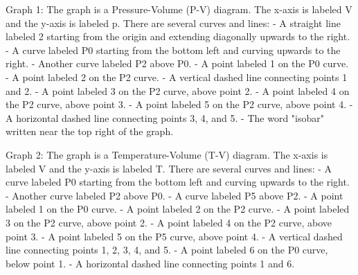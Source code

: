 Graph 1: The graph is a Pressure-Volume (P-V) diagram. The x-axis is labeled V and the y-axis is labeled p. There are several curves and lines:
- A straight line labeled 2 starting from the origin and extending diagonally upwards to the right.
- A curve labeled P0 starting from the bottom left and curving upwards to the right.
- Another curve labeled P2 above P0.
- A point labeled 1 on the P0 curve.
- A point labeled 2 on the P2 curve.
- A vertical dashed line connecting points 1 and 2.
- A point labeled 3 on the P2 curve, above point 2.
- A point labeled 4 on the P2 curve, above point 3.
- A point labeled 5 on the P2 curve, above point 4.
- A horizontal dashed line connecting points 3, 4, and 5.
- The word "isobar" written near the top right of the graph.

Graph 2: The graph is a Temperature-Volume (T-V) diagram. The x-axis is labeled V and the y-axis is labeled T. There are several curves and lines:
- A curve labeled P0 starting from the bottom left and curving upwards to the right.
- Another curve labeled P2 above P0.
- A curve labeled P5 above P2.
- A point labeled 1 on the P0 curve.
- A point labeled 2 on the P2 curve.
- A point labeled 3 on the P2 curve, above point 2.
- A point labeled 4 on the P2 curve, above point 3.
- A point labeled 5 on the P5 curve, above point 4.
- A vertical dashed line connecting points 1, 2, 3, 4, and 5.
- A point labeled 6 on the P0 curve, below point 1.
- A horizontal dashed line connecting points 1 and 6.
